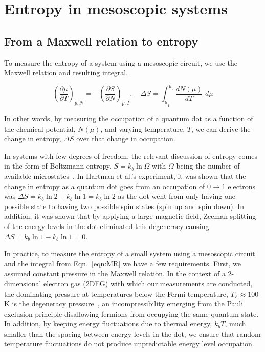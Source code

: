 
\chapter{Entropy in mesoscopic systems}
\label{ch:Theory}

\section{From a Maxwell relation to entropy}
\label{sec:mrtoentropy}

To measure the entropy of a system using a mesoscopic circuit, we use the Maxwell relation and resulting integral.

\begin{equation}
	\label{eqn:MR}
	\left( \frac{\partial \mu }{\partial T} \right)_{p,N} = -\left( \frac{\partial S}{\partial N} \right)_{p,T} , \quad
	\Delta S = \int_{\mu_1}^{\mu_2} \frac{dN(\mu)}{dT}\,\, d\mu
\end{equation}


In other words, by measuring the occupation of a quantum dot as a function of the chemical potential, $N(\mu)$, and varying temperature, $T$, we can derive the change in entropy, $\Delta S$ over that change in occupation.

In systems with few degrees of freedom, the relevant discussion of entropy comes in the form of Boltzmann entropy, $S = k_b \ln \Omega$ with $\Omega$ being the number of available microstates~\cite{schroeder}. In Hartman et al.'s experiment, it was shown that the change in entropy as a quantum dot goes from an occupation of $0 \to 1$ electrons was $\Delta S = k_b \ln 2 - k_b \ln 1 = k_b \ln 2$ as the dot went from only having one possible state to having two possible spin states (spin up and spin down). In addition, it was shown that by applying a large magnetic field, Zeeman splitting of the energy levels in the dot eliminated this degeneracy causing $\Delta S = k_b \ln 1 - k_b \ln 1 = 0$.

In practice, to measure the entropy of a small system using a mesoscopic circuit and the integral from Eqn.~\ref{eqn:MR} we have a few requirements. First, we assumed constant pressure in the Maxwell relation. In the context of a 2-dimensional electron gas (2DEG) with which our measurements are conducted, the dominating pressure at temperatures below the Fermi temperature, $T_F \approx 100$K is the degeneracy pressure~\cite{ashcroftmermin}, an incompressibility emerging from the Pauli exclusion principle disallowing fermions from occupying the same quantum state. In addition, by keeping energy fluctuations due to thermal energy, $k_bT$, much smaller than the spacing between energy levels in the dot, we ensure that random temperature fluctuations do not produce unpredictable energy level occupation.


